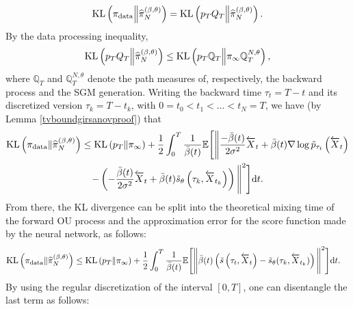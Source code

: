 \documentclass[english,graybox,envcountchap,envcountsame,sectrefs,shortlabels]{svmono}
\theoremstyle{style}
\newcommand{\eqsp}{}
\newcommand{\kl}{\mathrm{KL}}
\begin{document}
\begin{align*}
    \kl \left( \pi_{\rm data} \middle\| \pihat   \right)  = \kl\left( p_T Q_T \middle\| \pihat   \right)\eqsp.
\end{align*}
By the data processing inequality, 
\begin{align*}
     \kl \left( p_T Q_T \middle\| \pihat  \right) \leq \kl \left( p_T \mathbb{Q}_T \middle\| \pi_{\infty} \mathbb{Q}_T^{N,\theta}\right)\eqsp,
\end{align*}
where $\mathbb{Q}_T$ and $\mathbb{Q}_T^{N,\theta}$ denote the path measures of, respectively, the backward process and the SGM generation. Writing the backward time $\tau_t = T-t$ and its discretized version $\tau_k = T-t_k$, with $0=t_0<t_1<\ldots<t_N=T$, we have (by Lemma \ref{tvboundgirsanovproof}) that
\begin{multline*}
 \kl \left( \pi_{\rm data} \| \pihat   \right) \leq  \kl \left( p_T \| \pi_{\infty} \right) + \frac{1}{2} \int_0^T \frac{1}{\bar \sched(t)} \mathbb{E}\Bigg[ \Bigg\|  \frac{-  \bar \sched (t)}{2 \sigma^2} \overleftarrow{X}_t + \bar \sched (t) \nabla \log \tilde p_{\tau_t}\left( \ola{X}_t \right)    \\
- \left( - \frac{ \bar \sched (t)}{2 \sigma^2} \overleftarrow{X}_t + \bar \sched (t) \tilde s_{\param} \left( \tau_k, \ola{X}_{t_k}    \right) \right) \Bigg\|^2 \Bigg] \rmd t \eqsp.
\end{multline*}
From there, the KL divergence can be split into the theoretical mixing time of the forward OU process and the approximation error for the score function made by the neural network, as follows:
\begin{align*}
 &\kl \left( \pi_{\rm data} \| \pihat \right) \leq \kl \left( p_T \| \pi_{\infty} \right) +  \frac{1}{2} \int_0^T \frac{1}{\bar \sched(t)} \mathbb{E}\Bigg[ \Bigg\| \bar \sched (t) \left(  \tilde s\left(\tau_t,\ola X_t\right) - \tilde s_{\param} ( \tau_k, \ola{X}_{t_k}    ) \right)  \Bigg\|^2 \Bigg] \rmd t\eqsp.
\end{align*}
By using the regular discretization of the interval $[0,T]$, one can disentangle the last term as follows:
\end{document}

